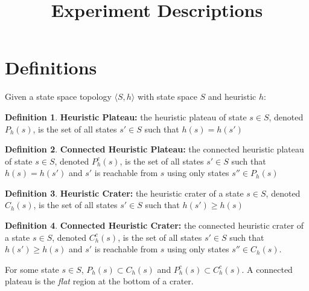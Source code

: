 \documentclass{article}
\title{Experiment Descriptions}
\author{}
\date{}
\theoremstyle{definition}
\newtheorem{definition}{Definition}[section]
\begin{document}
\maketitle
\pagestyle{plain}

\section{Definitions}
Given a state space topology $\langle S, h \rangle$ with state space $S$ and heuristic $h$: 
\begin{definition}
    \textbf{Heuristic Plateau:} the heuristic plateau of state $s \in S$, denoted $P_h(s)$, is the set of all states $s' \in S$ such that $h(s) = h(s')$
\end{definition}

\begin{definition}
    \textbf{Connected Heuristic Plateau:} the connected heuristic plateau of state $s \in S$, denoted $P^c_h(s)$, is the set of all states $s' \in S$ such that $h(s) = h(s')$ and $s'$ is reachable from $s$ using only states $s'' \in P_h(s)$
\end{definition}

\begin{definition}
    \textbf{Heuristic Crater:} the  heuristic crater of a state $s \in S$, denoted $C_h(s)$, is the set of all states $s' \in S$ such that $h(s') \geq h(s)$
\end{definition}

\begin{definition}
    \textbf{Connected Heuristic Crater:} the connected heuristic crater of a state $s \in S$, denoted $C^c_h(s)$, is the set of all states $s' \in S$ such that $h(s') \geq h(s)$ and $s'$ is reachable from $s$ using only states $s'' \in C_h(s)$. 
\end{definition}

For some state $s \in S$, $P_h(s) \subset C_h(s)$ and $P^c_h(s) \subset C^c_h(s)$. A connected plateau is the \textit{flat} region at the bottom of a crater. 
\end{document}
